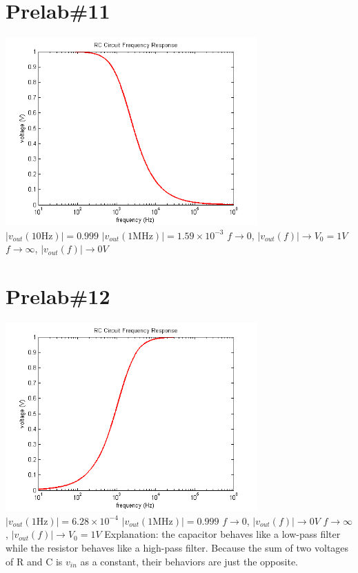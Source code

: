\documentclass{IEEEtran}
\begin{document}
	\section{Prelab\#11}
		\includegraphics[width=3.8in]{images/Prelab11.png}
		$|v_{out}(10\mathrm{Hz})| = 0.999$ \newline
		$|v_{out}({1\mathrm{MHz}})| = 1.59 \times 10^{-3}$ \newline
		$f \to 0$, $|v_{out}(f)| \to V_0 = 1V$ \newline 
		$f \to \infty$, $|v_{out}(f)| \to 0V$
	\section{Prelab\#12}
		\includegraphics[width=3.8in]{images/Prelab12.png}
		$|v_{out}(1\mathrm{Hz})| = 6.28 \times 10^{-4}$ \newline
		$|v_{out}({1\mathrm{MHz}})| = 0.999$ \newline
		$f \to 0$, $|v_{out}(f)| \to 0V$ \newline 
		$f \to \infty$, $|v_{out}(f)| \to V_0 = 1V$ \newline
		Explanation: the capacitor behaves like a low-pass filter while the resistor behaves like a high-pass filter. Because the sum of two voltages of R and C is $v_{in}$ as a constant, their behaviors are just the opposite.
\end{document}
